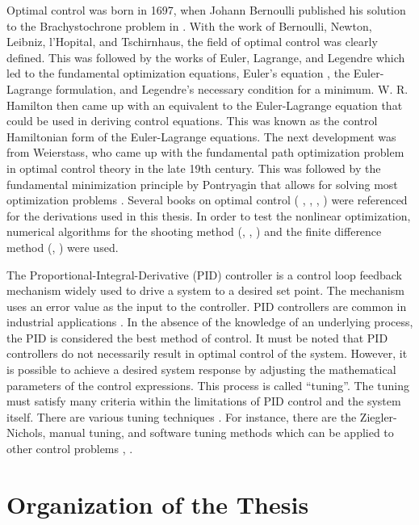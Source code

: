Optimal control was born in 1697, when Johann Bernoulli published his solution to the Brachystochrone problem in \cite{JBernoulli} . With the work of Bernoulli, Newton, Leibniz, l'Hopital, and Tschirnhaus, the field of optimal control was clearly defined. This was followed by the works of Euler, Lagrange, and Legendre which led to the fundamental optimization equations, Euler's equation \cite{LEuler}, the Euler-Lagrange formulation, and Legendre's necessary condition for a minimum. W. R. Hamilton then came up with an equivalent to the Euler-Lagrange equation that could be used in deriving control equations. This was known as the control Hamiltonian form of the Euler-Lagrange equations. The next development was from Weierstass, who came up with the fundamental path optimization problem in optimal control theory in the late 19th century. This was followed by the fundamental minimization principle by Pontryagin that allows for solving most optimization problems \cite{Pontry}. Several books on optimal control (\cite{lewis2012optimal} , \cite{BrysonHo69}, \cite{locatelli2001optimal}, \cite{athans2006optimal}) were referenced for the derivations used in this thesis. In order to test the nonlinear optimization, numerical algorithms for the shooting method (\cite{richard1988douglas}, \cite{rao2009engineering}, \cite{keller1992numerical}) and the finite difference method (\cite{rao2009engineering}, \cite{keller1992numerical}) were used.

The Proportional-Integral-Derivative (PID) controller is a control loop feedback mechanism widely used to drive a system to a desired set point. The mechanism uses an error value as the input to the controller. PID controllers are common in industrial applications \cite{o2006reducing}. In the absence of the knowledge of an underlying process, the PID is considered the best method of control. It must be noted that PID controllers do not necessarily result in optimal control of the system. However, it is possible to achieve a desired system response by adjusting the mathematical parameters of the control expressions. This process is called ``tuning''. The tuning must satisfy many criteria within the limitations of PID control and the system itself. There are various tuning techniques \cite{bequette2003process}. For instance, there are the Ziegler-Nichols, manual tuning, and software tuning methods which can be applied to other control problems \cite{AngChong}, \cite{Bennett}.


\section{Organization of the Thesis}

